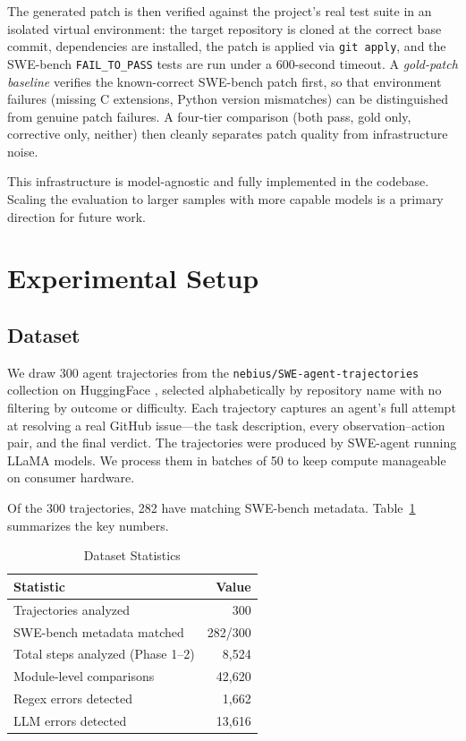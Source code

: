 \documentclass{ieeeaccess}
\begin{document}
The generated patch is then verified against the project's real test suite in an isolated virtual environment: the target repository is cloned at the correct base commit, dependencies are installed, the patch is applied via \texttt{git apply}, and the SWE-bench \texttt{FAIL\_TO\_PASS} tests are run under a 600-second timeout. A \emph{gold-patch baseline} verifies the known-correct SWE-bench patch first, so that environment failures (missing C extensions, Python version mismatches) can be distinguished from genuine patch failures. A four-tier comparison (both pass, gold only, corrective only, neither) then cleanly separates patch quality from infrastructure noise.

This infrastructure is model-agnostic and fully implemented in the codebase. Scaling the evaluation to larger samples with more capable models is a primary direction for future work.


\section{Experimental Setup}
\label{sec:experiments}

\subsection{Dataset}

We draw 300 agent trajectories from the \texttt{nebius/SWE-agent-trajectories} collection on HuggingFace \cite{b10}, selected alphabetically by repository name with no filtering by outcome or difficulty. Each trajectory captures an agent's full attempt at resolving a real GitHub issue---the task description, every observation--action pair, and the final verdict. The trajectories were produced by SWE-agent \cite{b3} running LLaMA models. We process them in batches of 50 to keep compute manageable on consumer hardware.

Of the 300 trajectories, 282 have matching SWE-bench metadata. Table~\ref{tab:dataset} summarizes the key numbers.

\begin{table}[h!]
\caption{Dataset Statistics}
\label{tab:dataset}
\centering
\setlength{\tabcolsep}{3pt}
\renewcommand{\arraystretch}{1.5}
\begin{tabularx}{\columnwidth}{|X|r|}
\hline
\textbf{Statistic} & \textbf{Value} \\
\hline
Trajectories analyzed              & 300 \\
\hline
SWE-bench metadata matched        & 282/300 \\
\hline
Total steps analyzed (Phase 1--2) & 8,524 \\
\hline
Module-level comparisons          & 42,620 \\
\hline
Regex errors detected             & 1,662 \\
\hline
LLM errors detected               & 13,616 \\
\hline
\end{tabularx}
\end{table}
\end{document}
